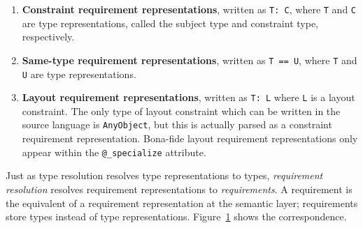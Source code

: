 \documentclass[a4paper,headsepline,bibliography=totoc,toc=flat,fleqn,twoside=semi]{scrbook}
\theoremstyle{definition}
\theoremstyle{definition}
\theoremstyle{definition}
\newcommand{\mathboxed}[1]{\boxed{\mbox{\vphantom{pI\texttt{pI}}#1}}}
\begin{document}
\begin{enumerate}
\item \textbf{Constraint requirement representations}, written as \texttt{T:\ C}, where \texttt{T} and \texttt{C} are type representations, called the subject type and constraint type, respectively.
\item \textbf{Same-type requirement representations}, written as \texttt{T == U}, where \texttt{T} and \texttt{U} are type representations.
\item \textbf{Layout requirement representations}, written as \texttt{T:\ L} where \texttt{L} is a layout constraint. The only type of layout constraint which can be written in the source language is \texttt{AnyObject}, but this is actually parsed as a constraint requirement representation. Bona-fide layout requirement representations only appear within the \texttt{@\_specialize} attribute.
\end{enumerate}
Just as type resolution resolves type representations to types, \emph{requirement resolution} resolves requirement representations to \emph{requirements}. A requirement is the equivalent of a requirement representation at the semantic layer; requirements store types instead of type representations. Figure~\ref{typerequirementrepresentation} shows the correspondence.
\begin{figure}\label{typerequirementrepresentation}
\begin{center}
\end{center}
\end{figure}
\end{document}
